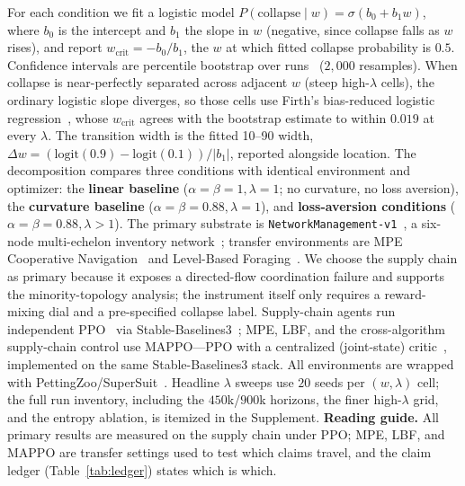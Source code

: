 \documentclass[letterpaper]{article} %
\theoremstyle{plain}
\newcommand{\wcrit}{w_{\mathrm{crit}}}
\begin{document}
For each condition we fit a logistic model $P(\mathrm{collapse}\mid w)=\sigma(b_0+b_1 w)$, where
$b_0$ is the intercept and $b_1$ the slope in $w$ (negative, since collapse falls as $w$ rises), and
report $\wcrit=-b_0/b_1$, the $w$ at which fitted collapse probability is $0.5$. Confidence intervals
are percentile bootstrap over runs~\citep{efron1993bootstrap} ($2{,}000$ resamples). When collapse is near-perfectly separated
across adjacent $w$ (steep high-$\lambda$ cells), the ordinary logistic slope diverges, so those
cells use Firth's bias-reduced logistic regression~\citep{firth1993}, whose $\wcrit$ agrees with the
bootstrap estimate to within $0.019$ at every $\lambda$. The transition width is the fitted 10--90
width, $\Delta w=(\mathrm{logit}(0.9)-\mathrm{logit}(0.1))/|b_1|$, reported alongside location. The
decomposition compares three conditions with identical environment and optimizer: the
\textbf{linear baseline} ($\alpha{=}\beta{=}1,\lambda{=}1$; no curvature, no loss aversion), the
\textbf{curvature baseline} ($\alpha{=}\beta{=}0.88,\lambda{=}1$), and \textbf{loss-aversion
conditions} ($\alpha{=}\beta{=}0.88,\lambda>1$). The primary substrate is
\texttt{NetworkManagement-v1}~\citep{hubbs2020orgym}, a six-node multi-echelon inventory
network~\citep{oroojlooyjadid2022,gijsbrechts2022,marlim2023}; transfer environments are MPE
Cooperative Navigation~\citep{lowe2017multi} and Level-Based Foraging~\citep{christianos2020shared}.
We choose the supply chain as primary because it exposes a directed-flow coordination failure and
supports the minority-topology analysis; the instrument itself only requires a reward-mixing dial
and a pre-specified collapse label. Supply-chain agents run independent PPO~\citep{schulman2017ppo}
via Stable-Baselines3~\citep{raffin2021sb3}; MPE, LBF, and the cross-algorithm supply-chain control
use MAPPO---PPO with a centralized (joint-state) critic~\citep{yu2022surprising}, implemented on the
same Stable-Baselines3 stack. All environments are wrapped with
PettingZoo/SuperSuit~\citep{terry2021pettingzoo,terry2020supersuit}. Headline $\lambda$ sweeps use
$20$ seeds per $(w,\lambda)$ cell; the full run inventory, including the $450$k/$900$k horizons, the
finer high-$\lambda$ grid, and the entropy ablation, is itemized in the Supplement.
\textbf{Reading guide.} All primary results are measured on the supply chain under PPO; MPE, LBF, and
MAPPO are transfer settings used to test which claims travel, and the claim ledger
(Table~\ref{tab:ledger}) states which is which.

\end{document}
